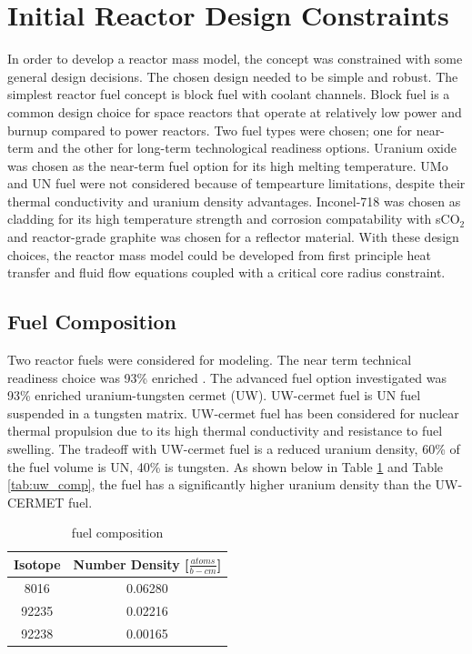 \section{Initial Reactor Design Constraints}
    In order to develop a reactor mass model, the concept was constrained with
some general design decisions. The chosen design needed to be simple and robust. 
The simplest reactor fuel concept is block fuel with coolant channels. 
Block fuel is a common design choice for space reactors that operate at relatively 
low power and burnup compared to power reactors. Two fuel types were chosen; one for
near-term and the other for long-term technological readiness options. Uranium
oxide was chosen as the near-term fuel option for its high melting temperature.
UMo and UN fuel were not considered because of tempearture limitations, despite
their thermal conductivity and uranium density advantages. Inconel-718 was
chosen as cladding for its high temperature strength and corrosion
compatability with sCO$_2$ and reactor-grade graphite was chosen for a
reflector material. With these design choices, the reactor mass model
could be developed from first principle heat transfer and fluid flow equations
coupled with a critical core radius constraint.

\subsection{Fuel Composition}
Two reactor fuels were considered for modeling. The near term technical
readiness choice was 93\% enriched \uox. The advanced fuel option investigated
was 93\% enriched uranium-tungsten cermet (UW). UW-cermet fuel is UN fuel suspended in a
tungsten matrix. UW-cermet fuel has been considered for nuclear thermal
propulsion due to its high thermal conductivity and resistance to fuel swelling.
The tradeoff with UW-cermet fuel is a reduced uranium density, 60\% of the fuel
volume is UN, 40\% is tungsten. As shown below in Table \ref{tab:uox_comp} and
Table \ref{tab:uw_comp}, the \uox fuel has a significantly higher uranium
density than the UW-CERMET fuel.

\begin{table}[h]
  \centering
  \caption{\uox fuel composition}
  \begin{tabular}{cc}
    \toprule
    Isotope   & Number Density [$\frac{atoms}{b-cm}$] \\
    \midrule
    8016	&	0.06280	\\
    92235	&	0.02216	\\
    92238	&	0.00165	\\
  \end{tabular}
  \label{tab:uox_comp}
\end{table}
    
